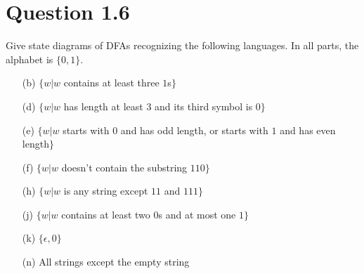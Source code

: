 \documentclass[13pt]{article}
\begin{document}
\newpage
\section*{Question 1.6}
Give state diagrams of DFAs recognizing the following languages. In all parts, the alphabet is $\{0, 1\}$.
\begin{enumerate}
\item [(b)] $\{w | w $ contains at least three $1$s$\}$
\item [(d)] $\{w | w $ has length at least $3$ and its third symbol is $0\}$
\item [(e)] $\{w | w $ starts with $0$ and has odd length, or starts with $1$ and has even length$\}$
\item [(f)] $\{w | w $ doesn't contain the substring $110\}$
\item [(h)] $\{w | w $ is any string except $11$ and $111\}$
\item [(j)] $\{w | w $ contains at least two $0$s and at most one $1\}$
\item [(k)] $\{\epsilon, 0\}$
\item [(n)] All strings except the empty string
\end{enumerate}
\end{document}
